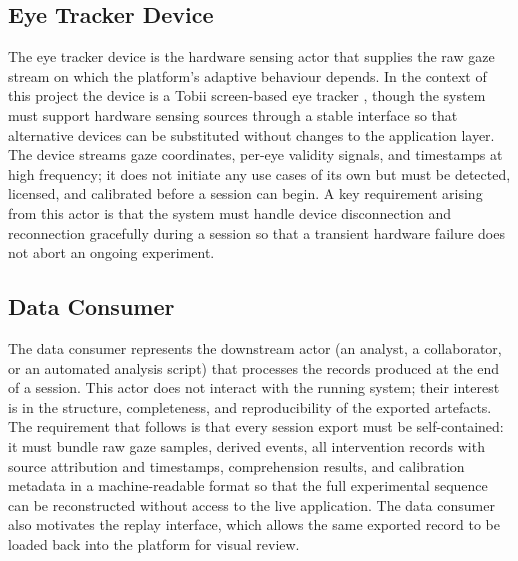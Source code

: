 \subsection{Eye Tracker Device}
\label{sec:stakeholder-eyetracker}

The eye tracker device is the hardware sensing actor that supplies the raw gaze stream on which the platform's adaptive behaviour depends.
In the context of this project the device is a Tobii screen-based eye tracker \cite{tobii2025fusion}, though the system must support hardware sensing sources through a stable interface so that alternative devices can be substituted without changes to the application layer.
The device streams gaze coordinates, per-eye validity signals, and timestamps at high frequency; it does not initiate any use cases of its own but must be detected, licensed, and calibrated before a session can begin.
A key requirement arising from this actor is that the system must handle device disconnection and reconnection gracefully during a session so that a transient hardware failure does not abort an ongoing experiment.

\subsection{Data Consumer}
\label{sec:stakeholder-consumer}

The data consumer represents the downstream actor (an analyst, a collaborator, or an automated analysis script) that processes the records produced at the end of a session.
This actor does not interact with the running system; their interest is in the structure, completeness, and reproducibility of the exported artefacts.
The requirement that follows is that every session export must be self-contained: it must bundle raw gaze samples, derived events, all intervention records with source attribution and timestamps, comprehension results, and calibration metadata in a machine-readable format so that the full experimental sequence can be reconstructed without access to the live application.
The data consumer also motivates the replay interface, which allows the same exported record to be loaded back into the platform for visual review.

